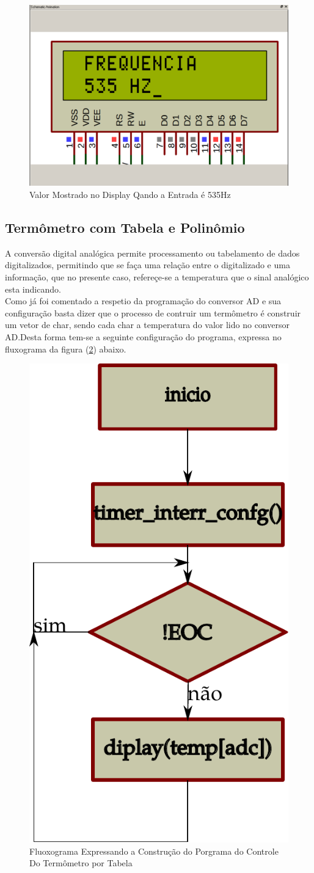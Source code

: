 \documentclass{Fabiano_file}
\begin{document}
{\begin{figure}[h!]
\centering
\includegraphics[width=.6\textwidth]{frequencimetro_display.pdf}
\caption{Valor Mostrado no Display Qando a Entrada é 535Hz}
\label{fig:frequencimetro_display}
\end{figure}


\newpage

\subsection{Termômetro com Tabela e Polinômio}
A conversão digital analógica permite processamento ou tabelamento de dados digitalizados, permitindo  que se faça uma relação entre o digitalizado e uma informação, 
que no presente caso, refereçe-se a temperatura que o sinal analógico esta indicando.\\

Como já foi comentado a respetio da programação do conversor AD e sua configuração basta dizer que o processo de contruir um termômetro é construir um vetor de  char, 
sendo cada char a temperatura do valor lido no conversor AD.Desta forma tem-se a seguinte configuração do programa, expressa no fluxograma da figura (\ref{fig:fluxograma_termometro_tabela}) abaixo.

\begin{figure}[h!]
\centering
\includegraphics[width=.3\textwidth]{fluxograma_termometro_tabela.pdf}
\caption{Fluoxograma Expressando a Construção do Porgrama do Controle Do Termômetro por Tabela}
\label{fig:fluxograma_termometro_tabela}
\end{figure}

}
\end{document}
